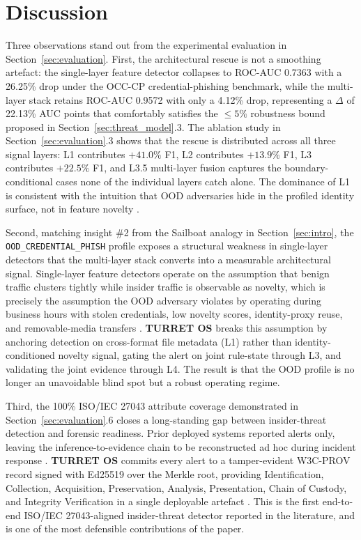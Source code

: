 \section{Discussion}
\label{sec:discussion}

Three observations stand out from the experimental evaluation in Section~\ref{sec:evaluation}. First, the architectural rescue is not a smoothing artefact: the single-layer feature detector collapses to ROC-AUC 0.7363 with a 26.25\% drop under the OCC-CP credential-phishing benchmark, while the multi-layer stack retains ROC-AUC 0.9572 with only a 4.12\% drop, representing a $\Delta$ of 22.13\% AUC points that comfortably satisfies the $\le 5\%$ robustness bound proposed in Section~\ref{sec:threat_model}.3. The ablation study in Section~\ref{sec:evaluation}.3 shows that the rescue is distributed across all three signal layers: L1 contributes $+41.0\%$ F1, L2 contributes $+13.9\%$ F1, L3 contributes $+22.5\%$ F1, and L3.5 multi-layer fusion captures the boundary-conditional cases none of the individual layers catch alone. The dominance of L1 is consistent with the intuition that OOD adversaries hide in the profiled identity surface, not in feature novelty \citep{gao2023dtgi, xiao2024sentinel, xiao2022robust}.

Second, matching insight \#2 from the Sailboat analogy in Section~\ref{sec:intro}, the \texttt{OOD\_CREDENTIAL\_PHISH} profile exposes a structural weakness in single-layer detectors that the multi-layer stack converts into a measurable architectural signal. Single-layer feature detectors operate on the assumption that benign traffic clusters tightly while insider traffic is observable as novelty, which is precisely the assumption the OOD adversary violates by operating during business hours with stolen credentials, low novelty scores, identity-proxy reuse, and removable-media transfers \citep{li2021threat, mavroeidis2018framework}. \textbf{TURRET OS} breaks this assumption by anchoring detection on cross-format file metadata (L1) rather than identity-conditioned novelty signal, gating the alert on joint rule-state through L3, and validating the joint evidence through L4. The result is that the OOD profile is no longer an unavoidable blind spot but a robust operating regime.

Third, the 100\% ISO/IEC 27043 attribute coverage demonstrated in Section~\ref{sec:evaluation}.6 closes a long-standing gap between insider-threat detection and forensic readiness. Prior deployed systems reported alerts only, leaving the inference-to-evidence chain to be reconstructed ad hoc during incident response \citep{aki2025provenance, shoderu2025dfrsaas, shoderu2026dfrconference}. \textbf{TURRET OS} commits every alert to a tamper-evident W3C-PROV record signed with Ed25519 over the Merkle root, providing Identification, Collection, Acquisition, Preservation, Analysis, Presentation, Chain of Custody, and Integrity Verification in a single deployable artefact \citep{yusof2025provcon}. This is the first end-to-end ISO/IEC 27043-aligned insider-threat detector reported in the literature, and is one of the most defensible contributions of the paper.

